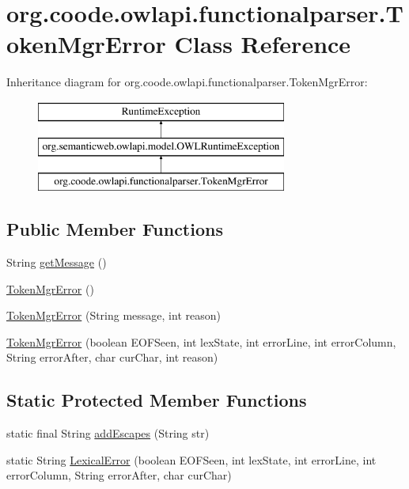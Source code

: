 \hypertarget{classorg_1_1coode_1_1owlapi_1_1functionalparser_1_1_token_mgr_error}{\section{org.\-coode.\-owlapi.\-functionalparser.\-Token\-Mgr\-Error Class Reference}
\label{classorg_1_1coode_1_1owlapi_1_1functionalparser_1_1_token_mgr_error}
}
Inheritance diagram for org.\-coode.\-owlapi.\-functionalparser.\-Token\-Mgr\-Error\-:\begin{figure}[H]
\begin{center}
\leavevmode
\includegraphics[height=3.000000cm]{classorg_1_1coode_1_1owlapi_1_1functionalparser_1_1_token_mgr_error}
\end{center}
\end{figure}
\subsection*{Public Member Functions}
\begin{DoxyCompactItemize}
\item 
String \hyperlink{classorg_1_1coode_1_1owlapi_1_1functionalparser_1_1_token_mgr_error_a748c392bf0c37c99bd86c5fad1f22cac}{get\-Message} ()
\item 
\hyperlink{classorg_1_1coode_1_1owlapi_1_1functionalparser_1_1_token_mgr_error_a1cb5166a351df8608cb1b33ec8cd0db0}{Token\-Mgr\-Error} ()
\item 
\hyperlink{classorg_1_1coode_1_1owlapi_1_1functionalparser_1_1_token_mgr_error_a0057f3a7c748767bb6d2f6908e39dccb}{Token\-Mgr\-Error} (String message, int reason)
\item 
\hyperlink{classorg_1_1coode_1_1owlapi_1_1functionalparser_1_1_token_mgr_error_ab1f3105139bec5b75f36ec72a872fde4}{Token\-Mgr\-Error} (boolean E\-O\-F\-Seen, int lex\-State, int error\-Line, int error\-Column, String error\-After, char cur\-Char, int reason)
\end{DoxyCompactItemize}
\subsection*{Static Protected Member Functions}
\begin{DoxyCompactItemize}
\item 
static final String \hyperlink{classorg_1_1coode_1_1owlapi_1_1functionalparser_1_1_token_mgr_error_a1d8b90145aabe963ba5e963411973638}{add\-Escapes} (String str)
\item 
static String \hyperlink{classorg_1_1coode_1_1owlapi_1_1functionalparser_1_1_token_mgr_error_afc2cb74072cbe3229dd6a9ca811aefe3}{Lexical\-Error} (boolean E\-O\-F\-Seen, int lex\-State, int error\-Line, int error\-Column, String error\-After, char cur\-Char)
\end{DoxyCompactItemize}

